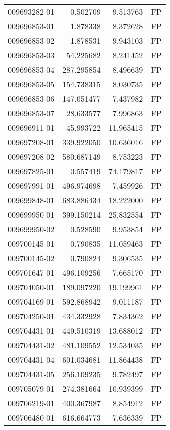 \begin{tabular}{lrrl}
009693282-01 &    0.502709 &     9.513763 &   FP \\
009696853-01 &    1.878338 &     8.372628 &   FP \\
009696853-02 &    1.878531 &     9.943103 &   FP \\
009696853-03 &   54.225682 &     8.241452 &   FP \\
009696853-04 &  287.295854 &     8.496639 &   FP \\
009696853-05 &  154.738315 &     8.030735 &   FP \\
009696853-06 &  147.051477 &     7.437982 &   FP \\
009696853-07 &   28.633577 &     7.996863 &   FP \\
009696911-01 &   45.993722 &    11.965415 &   FP \\
009697208-01 &  339.922050 &    10.636016 &   FP \\
009697208-02 &  580.687149 &     8.753223 &   FP \\
009697825-01 &    0.557419 &    74.179817 &   FP \\
009697991-01 &  496.974698 &     7.459926 &   FP \\
009699848-01 &  683.886434 &    18.222000 &   FP \\
009699950-01 &  399.150214 &    25.832554 &   FP \\
009699950-02 &    0.528590 &     9.953854 &   FP \\
009700145-01 &    0.790835 &    11.059463 &   FP \\
009700145-02 &    0.790824 &     9.306535 &   FP \\
009701647-01 &  496.109256 &     7.665170 &   FP \\
009704050-01 &  189.097220 &    19.199961 &   FP \\
009704169-01 &  592.868942 &     9.011187 &   FP \\
009704250-01 &  434.332928 &     7.834362 &   FP \\
009704431-01 &  449.510319 &    13.688012 &   FP \\
009704431-02 &  481.109552 &    12.534035 &   FP \\
009704431-04 &  601.034681 &    11.864438 &   FP \\
009704431-05 &  256.109235 &     9.782497 &   FP \\
009705079-01 &  274.381664 &    10.939399 &   FP \\
009706219-01 &  400.367987 &     8.854912 &   FP \\
009706480-01 &  616.664773 &     7.636339 &   FP \\

\end{tabular}
